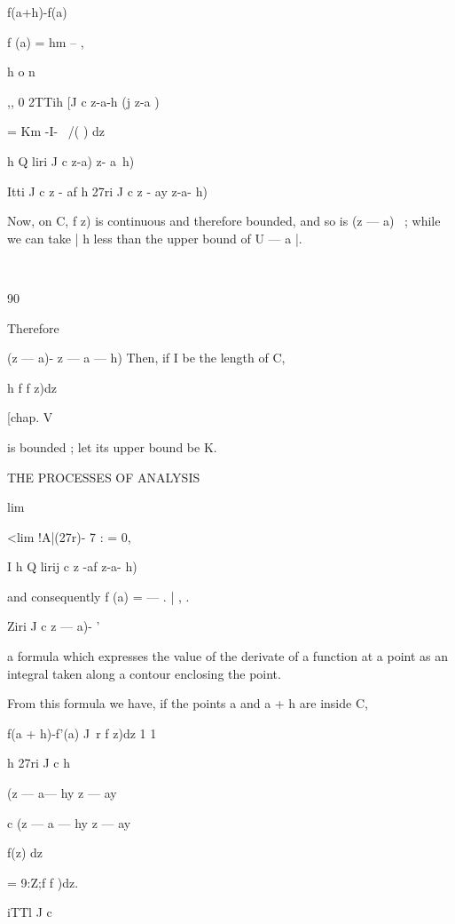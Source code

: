 {{f(a+h)-f(a)

f (a) = hm -- ,

h o n

,, 0 2TTih [J c z-a-h (j z-a )

= Km -I- \ /( ) dz

h Q liri J c z-a) z- a~h)

Itti J c z - af h 27ri J c z - ay z-a- h)

Now, on C, f z) is continuous and therefore bounded, and so is (z —
a)~ ; while we can take | h less than the upper bound of U — a |.



\



90



Therefore



(z — a)- z — a — h) Then, if I be the length of C,

h f f z)dz



[chap. V

is bounded ; let its upper bound be K.



THE PROCESSES OF ANALYSIS



lim



<lim !A|(27r)- 7 : = 0,



I h Q lirij c z -af z-a- h)

and consequently f (a) = — . | , .

   Ziri J c z — a)- '

a formula which expresses the value of the derivate of a function at a
point as an integral taken along a contour enclosing the point.

From this formula we have, if the points a and a + h are inside C,

f(a + h)-f'(a) J\ r f z)dz 1 1

h 27ri J c h



(z — a— hy z — ay

c (z — a — hy z — ay

f(z) dz



= 9:Z;f f )dz.

iTTl J c



}}
